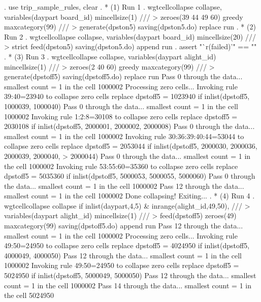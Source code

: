 . use trip_sample_rules, clear
{\smallskip}
. * (1) Run 1
. wgtcellcollapse collapse, variables(daypart board_id) mincellsize(1) ///
>         zeroes(39 44 49 60) greedy maxcategory(99) ///
>         generate(dpston5) saving(dpston5.do) replace run
\smallskip
\oom
\smallskip
. * (2) Run 2
. wgtcellcollapse collapse, variables(daypart board_id) mincellsize(20) ///
>         strict feed(dpston5) saving(dpston5.do) append run
\smallskip
\oom
\smallskip
. assert "`r(failed)'" == ""
{\smallskip}
. * (3) Run 3
. wgtcellcollapse collapse, variables(daypart alight_id) mincellsize(1) ///
>         zeroes(2 40 60) greedy maxcategory(99) ///
>         generate(dpstoff5) saving(dpstoff5.do) replace run
Pass 0 through the data...
  smallest count = 1 in the cell      1000002
{\smallskip}
Processing zero cells...
{\smallskip}
  Invoking rule 39:40=23940 to collapse zero cells
  replace dpstoff5 = 1023940 if inlist(dpstoff5, 1000039, 1000040)
Pass 0 through the data...
  smallest count = 1 in the cell      1000002
  Invoking rule 1:2:8=30108 to collapse zero cells
  replace dpstoff5 = 2030108 if inlist(dpstoff5, 2000001, 2000002, 2000008)
Pass 0 through the data...
  smallest count = 1 in the cell      1000002
  Invoking rule 30:36:39:40:44=53044 to collapse zero cells
  replace dpstoff5 = 2053044 if inlist(dpstoff5, 2000030, 2000036, 2000039, 2000040,
>  2000044)
\smallskip
\oom
\smallskip
Pass 0 through the data...
  smallest count = 1 in the cell      1000002
  Invoking rule 53:55:60=35360 to collapse zero cells
  replace dpstoff5 = 5035360 if inlist(dpstoff5, 5000053, 5000055, 5000060)
Pass 0 through the data...
  smallest count = 1 in the cell      1000002
Pass 12 through the data...
  smallest count = 1 in the cell      1000002
  Done collapsing! Exiting...
{\smallskip}
. * (4) Run 4
. wgtcellcollapse collapse if inlist(daypart,4,5) \& inrange(alight_id,49,50), ///
>         variables(daypart alight_id) mincellsize(1) ///
>         feed(dpstoff5) zeroes(49) maxcategory(99) saving(dpstoff5.do) append run
Pass 12 through the data...
  smallest count = 1 in the cell      1000002
{\smallskip}
Processing zero cells...
{\smallskip}
  Invoking rule 49:50=24950 to collapse zero cells
  replace dpstoff5 = 4024950 if inlist(dpstoff5, 4000049, 4000050)
Pass 12 through the data...
  smallest count = 1 in the cell      1000002
  Invoking rule 49:50=24950 to collapse zero cells
  replace dpstoff5 = 5024950 if inlist(dpstoff5, 5000049, 5000050)
Pass 12 through the data...
  smallest count = 1 in the cell      1000002
Pass 14 through the data...
  smallest count = 1 in the cell      5024950
